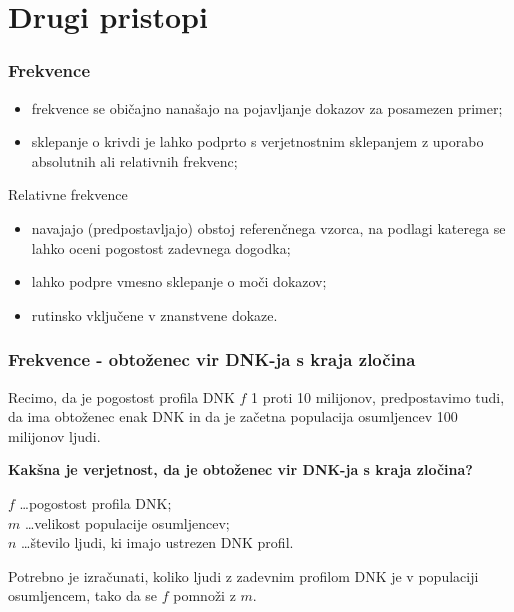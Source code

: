 \documentclass{beamer}
\begin{document}
\section{Drugi pristopi}

\begin{frame}
    \frametitle{Frekvence}
    \begin{itemize}
        \item frekvence se običajno nanašajo na pojavljanje dokazov za posamezen primer;
        \item sklepanje o krivdi je lahko podprto s verjetnostnim sklepanjem z uporabo absolutnih ali relativnih frekvenc;
    \end{itemize}
    \begin{block}{Relativne frekvence}
        \begin{itemize}
            \item navajajo (predpostavljajo) obstoj referenčnega vzorca, na podlagi katerega se lahko oceni pogostost zadevnega dogodka;
            \item lahko podpre vmesno sklepanje o moči dokazov;
            \item rutinsko vključene v znanstvene dokaze.
        \end{itemize}  
    \end{block}
\end{frame}

\begin{frame}
    \frametitle{Frekvence - obtoženec vir DNK-ja s kraja zločina}
    Recimo, da je pogostost profila DNK $f$ 1 proti 10 milijonov, predpostavimo tudi, da ima obtoženec enak DNK in da je začetna populacija osumljencev 100 milijonov ljudi.
    \begin{block}{}
        \textbf{Kakšna je verjetnost, da je obtoženec vir DNK-ja s kraja zločina?}
    \end{block} \vspace{3mm}
    $f$ \dots pogostost profila DNK;\\
    $m$ \dots velikost populacije osumljencev; \\
    $n$ \dots število ljudi, ki imajo ustrezen DNK profil. \\
    \begin{block}{}
        Potrebno je izračunati, koliko ljudi z zadevnim profilom DNK je v populaciji osumljencem, tako da se $f$ pomnoži z $m$.
    \end{block} 
\end{frame}
\end{document}
